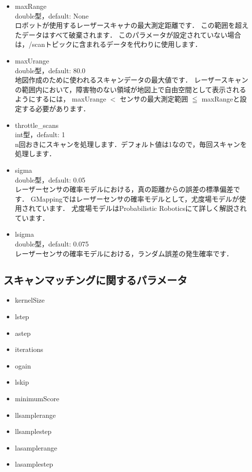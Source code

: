 \documentclass[{../../master}]{subfiles}
\begin{document}
\begin{itemize}
  \item \textsf{maxRange} \\
    double型，default: None\\
    ロボットが使用するレーザースキャナの最大測定距離です．
    この範囲を超えたデータはすべて破棄されます．
    このパラメータが設定されていない場合は，\textsf{/scan}トピックに含まれるデータを代わりに使用します．
  \item \textsf{maxUrange} \\
    double型，default: 80.0 \\
    地図作成のために使われるスキャンデータの最大値です．
    レーザースキャンの範囲内において，障害物のない領域が地図上で自由空間として表示されるようにするには，
    \textsf{maxUrange} $<$ センサの最大測定範囲 $\leqq$ \textsf{maxRange}と設定する必要があります．
  \item \textsf{throttle\_scans} \\
    int型，default: 1 \\
    n回おきにスキャンを処理します．デフォルト値は1なので，毎回スキャンを処理します．
  \item \textsf{sigma} \\
    double型，default: 0.05 \\
    レーザーセンサの確率モデルにおける，真の距離からの誤差の標準偏差です．
    GMappingではレーザーセンサの確率モデルとして，尤度場モデルが使用されています．
    尤度場モデルはProbabilistic Robotics\cite{thrun2005probabilistic}にて詳しく解説されています．
  \item \textsf{lsigma} \\
    double型，default: 0.075 \\
    レーザーセンサの確率モデルにおける，ランダム誤差の発生確率です．
\end{itemize}

\subsection{スキャンマッチングに関するパラメータ}

\begin{itemize}
  \item \textsf{kernelSize}
  \item \textsf{lstep}
  \item \textsf{astep}
  \item \textsf{iterations}
  \item \textsf{ogain}
  \item \textsf{lskip}
  \item \textsf{minimumScore}
  \item \textsf{llsamplerange}
  \item \textsf{llsamplestep}
  \item \textsf{lasamplerange}
  \item \textsf{lasamplestep}
\end{itemize}
\end{document}
